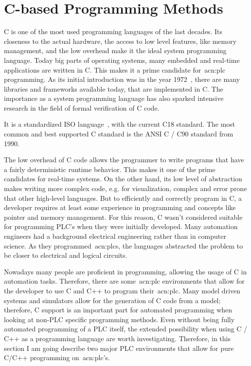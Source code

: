 \section{C-based Programming Methods}
\label{sec:c_methods}

C is one of the most used programming languages of the last decades.
Its closeness to the actual hardware, the access to low level features, like memory management, and the low overhead make it the ideal system programming language.
Today big parts of operating systems, many embedded and real-time applications are written in C.
This makes it a prime candidate for~\acrshort{acn:plc} programming.
As its initial introduction was in the year 1972~\cite{10.5555/576122}, there are many libraries and frameworks available today, that are implemented in C.
The importance as a system programming language has also sparked intensive research in the field of formal verification of C code.

It is a standardized ISO language~\cite{ISO:9899:2018}, with the current C18 standard.
The most common and best supported C standard is the ANSI C / C90 standard from 1990.

The low overhead of C code allows the programmer to write programs that have a fairly deterministic runtime behavior.
This makes it one of the prime candidates for real-time systems.
On the other hand, its low level of abstraction makes writing more complex code, e.g. for visualization, complex and error prone that other high-level languages.
But to efficiently and correctly program in C, a developer requires at least some experience in programming and concepts like pointer and memory management.
For this reason, C wasn't considered suitable for programming PLC's when they were initially developed.
Many automation engineers had a background electrical engineering rather than in computer science.
As they programmed~\acrshort{acn:plc}s, the languages abstracted the problem to be closer to electrical and logical circuits.

Nowadays many people are proficient in programming, allowing the usage of C in automation tasks.
Therefore, there are some~\acrshort{acn:plc} environments that allow for the developer to use C and C++ to program their~\acrshort{acn:plc}.
Many model driven systems and simulators allow for the generation of C code from a model; therefore, C support is an important part for automated programming when looking at non-PLC specific programming methods.
Even without being fully automated programming of a PLC itself, the extended possibility when using C / C++ as a programming language are worth investigating.
Therefore, in this section I am going describe two major PLC environments that allow for pure C/C++ programming on~\acrshort{acn:plc}'s.

